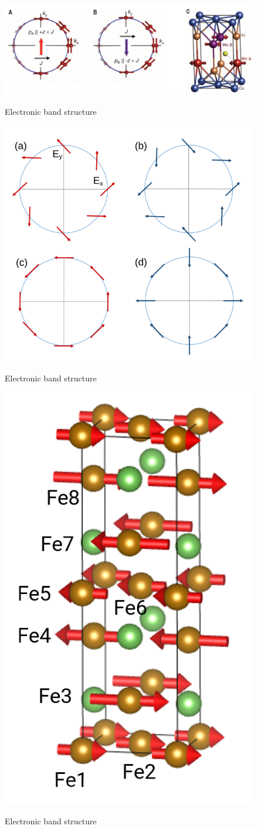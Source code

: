 \documentclass[11pt,edeposit,draftthesis]{uiucthesis2020}
\begin{document}
\begin{mainmatter}
\begin{figure}
\centering\includegraphics[width=\columnwidth]{figures/ch2/wadley_1.png} \\
\caption{\label{fig:wadley_1}
Electronic band structure
}
\end{figure}

\begin{figure}
\centering\includegraphics[width=0.7\columnwidth]{figures/ch2/rashba_dresselhaus.png} \\
\caption{\label{fig:rashba_dresselhaus}
Electronic band structure
}
\end{figure}

\begin{figure}
\centering\includegraphics[width=0.3\columnwidth]{figures/ch2/Fe2As.png} \\
\caption{\label{fig:Fe2As}
Electronic band structure
}
\end{figure}


\end{mainmatter}
\end{document}
